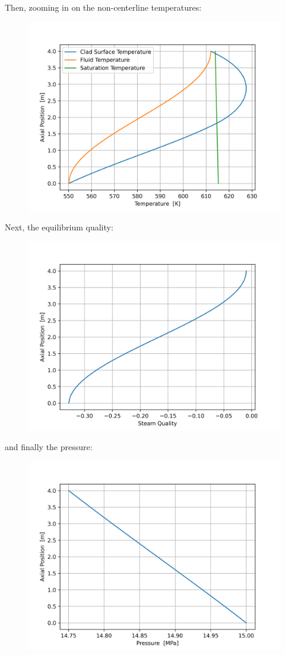 \documentclass{article}
\begin{document}
Then, zooming in on the non-centerline temperatures:
\begin{figure}[!hp!]
    \centering
    \includegraphics[width=0.5\linewidth]{tempnocl.png}
\end{figure}

\newpage
Next, the equilibrium quality:
\begin{figure}[!hp!]
    \centering
    \includegraphics[width=0.5\linewidth]{xeplot.png}
\end{figure}

and finally the pressure:
\begin{figure}[!hp!]
    \centering
    \includegraphics[width=0.5\linewidth]{pressureplot.png}
\end{figure}

\newpage
\end{document}
